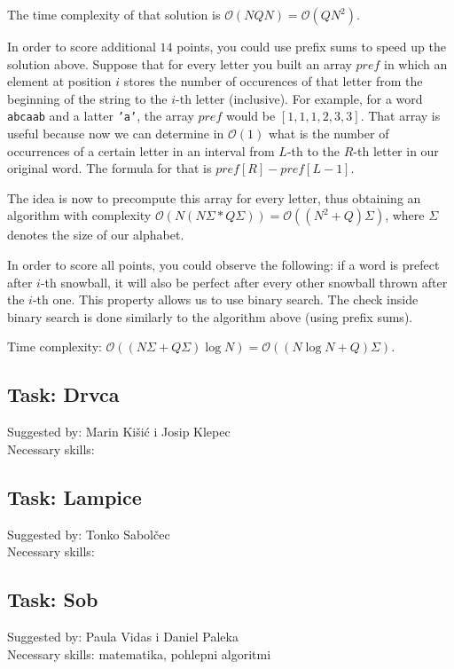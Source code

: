 \documentclass[a4paper]{article}
\begin{document}
The time complexity of that solution is $\mathcal{O}(NQN)=\mathcal{O}(QN^2)$.

In order to score additional $14$ points, you could use prefix sums to speed
up the solution above. Suppose that for every letter you built an array $pref$
in which an element at position $i$ stores the number of occurences of that
letter from the beginning of the string to the $i$-th letter (inclusive). For
example, for a word \texttt{abcaab} and a latter \texttt{'a'}, the array $pref$
would be $[1, 1, 1, 2, 3, 3]$. That array is useful because now we can determine
in $\mathcal{O}(1)$ what is the number of occurrences of a certain letter in
an interval from $L$-th to the $R$-th letter in our original word. The formula
for that is $pref[R]-pref[L-1]$.

The idea is now to precompute this array for every letter, thus obtaining an
algorithm with complexity $\mathcal{O}(N(N\Sigma * Q\Sigma))=
\mathcal{O}((N^2 + Q)\Sigma)$, where $\Sigma$ denotes the size of our
alphabet.

In order to score all points, you could observe the following: if a word is
prefect after $i$-th snowball, it will also be perfect after every other snowball
thrown after the $i$-th one. This property allows us to use binary search. The
check inside binary search is done similarly to the algorithm above (using
prefix sums).

Time complexity: $\mathcal{O}((N\Sigma + Q\Sigma)\log N) = \mathcal{O}((N \log N + Q)\Sigma)$.


\subsection*{Task: Drvca}
\textsf{Suggested by: Marin Kišić i Josip Klepec}\\
\textsf{Necessary skills: }

\subsection*{Task: Lampice}
\textsf{Suggested by: Tonko Sabolčec}\\
\textsf{Necessary skills: }

\subsection*{Task: Sob}
\textsf{Suggested by: Paula Vidas i Daniel Paleka}\\
\textsf{Necessary skills: matematika, pohlepni algoritmi}
\end{document}
